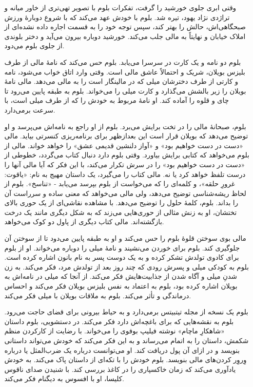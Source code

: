 \documentclass[12pt]{book}
\begin{document}
    وقتی ابری جلوی خورشید را گرفت، تفکرات بلوم با تصویر تهی‌تری از خاور میانه و تراژدی نژاد یهود، تیره شد. بلوم با خودش عهد می‌کند که با شروع دوبارۀ ورزش صبحگاهی‌اش، حالش را بهتر کند، سپس توجه خود را به قسمت اجاره داده نشده‌ای از املاک خیابان و نهایتاً به مالی جلب می‌کند. خورشید دوباره بیرون می‌آید و دختر بلوندی از جلوی بلوم می‌دود.

    بلوم دو نامه و یک کارت در سرسرا می‌یابد. بلوم حس می‌کند که نامۀ مالی از طرف بلیزس بویلان، شریک و احتمالاً عاشق مالی است. وقتی وارد اتاق خواب می‌شود، نامه و کارتی از طرف دخترشان میلی که در مالینگار است را به مالی می‌دهد. مالی نامۀ بویلان را زیر بالشش می‌گذارد و کارت میلی را می‌خواند. بلوم به طبقه پایین می‌رود تا چای و قلوه را آماده کند. او نامۀ مربوط به خودش را که از طرف میلی است، با سرعت برمی‌دارد.

    بلوم، صبحانۀ مالی را در تخت برایش می‌برد. بلوم از او راجع به نامه‌اش می‌پرسد و او توضیح می‌دهد که بویلان قرار است این بعدازظهر برای برنامه‌ریزی کنسرتی بیاید. مالی «دست در دست خواهیم بود» و «آواز دلنشین قدیمی عشق» را خواهد خواند. مالی از بلوم می‌خواهد که کتابی برایش بیاورد. وقتی بلوم دارد دنبال کتاب می‌گردد، خطوطی از «دست در دست خواهیم بود» را در سرش تکرار می‌کند، با این فکر که آیا مالی آنها را درست تلفظ خواهد کرد یا نه. مالی کتاب را می‌گیرد، یک داستان مهیج به نام: «یاقوت: غرورِ حلقه»، و کلمه‌ای را که می‌خواست از بلوم بپرسد می‌یابد - «تناسخ». بلوم از لحاظ ریشه‌شناسی توضیح می‌دهد، ولی مالی می‌خواهد که معنی ساده و سرراست آن را بداند. بلوم، کلمۀ حلول را توضیح می‌دهد. با مشاهده نقاشی‌ای از یک حوری بالای تختشان، او به زنش مثالی از حوری‌هایی می‌زند که به شکل دیگری مانند یک درخت بازگشته‌اند. مالی کتاب دیگری از پاول دو کوک می‌خواهد.

    مالی بوی سوختن قلوۀ بلوم را حس می‌کند و او به طبقه پایین می‌دود تا از سوختن آن جلوگیری کند. بلوم برای خوردن می‌نشیند و نامۀ میلی را دوباره می‌خواند. او از بلوم برای کادوی تولدش تشکر کرده و به یک دوست پسر به نام بانون اشاره کرده است. بلوم به کودکی میلی و پسرش رودی که چند روز بعد از تولدش مرد، فکر می‌کند. به زن شدنِ میلی و آگاه شدن از جذابیت‌هایش فکر می‌کند. از آنجا که میلی در نامه‌اش به بویلان اشاره کرده بود، بلوم به اعتماد به نفس بلیزس بویلان فکر می‌کند و احساس درماندگی و تأثر می‌کند. بلوم به ملاقات بویلان با میلی فکر می‌کند.

    بلوم یک نسخه از مجله تیتبیتس برمی‌دارد و به حیاط بیرونی برای قضای حاجت می‌رود. بلوم به نقشه‌هایی که برای باغچه‌اش دارد فکر می‌کند. در دستشویی، بلوم داستان «شاهکارِ ماچام» نوشته فیلیپ بوفوی را می‌خواند. با رضایت از کارکردن منظم شکمش، داستان را به اتمام می‌رساند و به این فکر می‌کند که خودش می‌تواند داستانی بنویسد و در ازای آن پول دریافت کند. او می‌توانست درباره یک ضرب‌المثل یا درباره وِروِر کردن‌های مالی بنویسد. بلوم خودش را با تکه‌ای از داستان پاک می‌کند. به خودش یادآوری می‌کند که زمان خاکسپاری را در کاغذ بررسی کند. با شنیدن صدای ناقوس کلیسا، او با افسوس به دیگنام فکر می‌کند.
\end{document}
